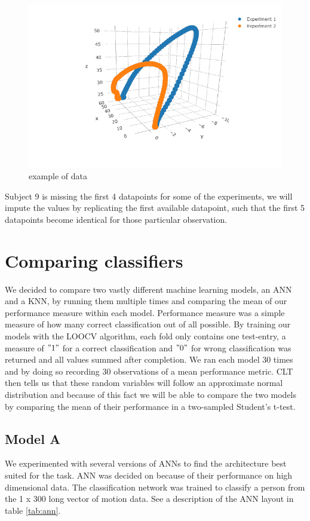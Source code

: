 \documentclass{article}
\begin{document}
\begin{figure}[H]
\includegraphics[width=\linewidth]{curve.png}
\caption{example of data}
\label{fig:trajectory}
\end{figure}

\noindent Subject 9 is missing the first 4 datapoints for some of the experiments, we will impute the values by replicating the first available datapoint, such that the first 5 datapoints become identical for those particular observation.

\section{Comparing classifiers}
We decided to compare two vastly different machine learning models, an ANN and a KNN, by running them multiple times and comparing the mean of our performance measure within each model. Performance measure was a simple measure of how many correct classification out of all possible. By training our models with the LOOCV algorithm, each fold only contains one test-entry, a measure of $"1"$ for a correct classification and $"0"$ for wrong classification was returned and all values summed after completion. We ran each model 30 times and by doing so recording 30 observations of a mean performance metric. CLT then tells us that these random variables will follow an approximate normal distribution and because of this fact we will be able to compare the two models by comparing the mean of their performance in a two-sampled Student's t-test.\\

\subsection{Model A}
We experimented with several versions of ANNs to find the architecture best suited for the task. ANN was decided on because of their performance on high dimensional data. The classification network was trained to classify a person from the 1 x 300 long vector of motion data. See a description of the ANN layout in table \ref{tab:ann}.
\end{document}
